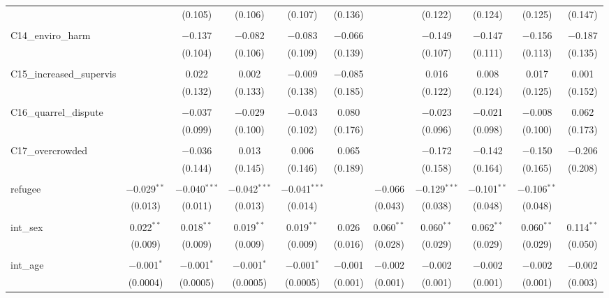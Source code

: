 \begin{table}[H]
\begin{tabular}{@{\extracolsep{4pt}}lcccccccccc}
  &  & (0.105) & (0.106) & (0.107) & (0.136) &  & (0.122) & (0.124) & (0.125) & (0.147) \\ 
  & & & & & & & & & & \\ 
 C14\_enviro\_harm &  & $-$0.137 & $-$0.082 & $-$0.083 & $-$0.066 &  & $-$0.149 & $-$0.147 & $-$0.156 & $-$0.187 \\ 
  &  & (0.104) & (0.106) & (0.109) & (0.139) &  & (0.107) & (0.111) & (0.113) & (0.135) \\ 
  & & & & & & & & & & \\ 
 C15\_increased\_supervis &  & 0.022 & 0.002 & $-$0.009 & $-$0.085 &  & 0.016 & 0.008 & 0.017 & 0.001 \\ 
  &  & (0.132) & (0.133) & (0.138) & (0.185) &  & (0.122) & (0.124) & (0.125) & (0.152) \\ 
  & & & & & & & & & & \\ 
 C16\_quarrel\_dispute &  & $-$0.037 & $-$0.029 & $-$0.043 & 0.080 &  & $-$0.023 & $-$0.021 & $-$0.008 & 0.062 \\ 
  &  & (0.099) & (0.100) & (0.102) & (0.176) &  & (0.096) & (0.098) & (0.100) & (0.173) \\ 
  & & & & & & & & & & \\ 
 C17\_overcrowded &  & $-$0.036 & 0.013 & 0.006 & 0.065 &  & $-$0.172 & $-$0.142 & $-$0.150 & $-$0.206 \\ 
  &  & (0.144) & (0.145) & (0.146) & (0.189) &  & (0.158) & (0.164) & (0.165) & (0.208) \\ 
  & & & & & & & & & & \\ 
 refugee & $-$0.029$^{**}$ & $-$0.040$^{***}$ & $-$0.042$^{***}$ & $-$0.041$^{***}$ &  & $-$0.066 & $-$0.129$^{***}$ & $-$0.101$^{**}$ & $-$0.106$^{**}$ &  \\ 
  & (0.013) & (0.011) & (0.013) & (0.014) &  & (0.043) & (0.038) & (0.048) & (0.048) &  \\ 
  & & & & & & & & & & \\ 
 int\_sex & 0.022$^{**}$ & 0.018$^{**}$ & 0.019$^{**}$ & 0.019$^{**}$ & 0.026 & 0.060$^{**}$ & 0.060$^{**}$ & 0.062$^{**}$ & 0.060$^{**}$ & 0.114$^{**}$ \\ 
  & (0.009) & (0.009) & (0.009) & (0.009) & (0.016) & (0.028) & (0.029) & (0.029) & (0.029) & (0.050) \\ 
  & & & & & & & & & & \\ 
 int\_age & $-$0.001$^{*}$ & $-$0.001$^{*}$ & $-$0.001$^{*}$ & $-$0.001$^{*}$ & $-$0.001 & $-$0.002 & $-$0.002 & $-$0.002 & $-$0.002 & $-$0.002 \\ 
  & (0.0004) & (0.0005) & (0.0005) & (0.0005) & (0.001) & (0.001) & (0.001) & (0.001) & (0.001) & (0.003) \\ 

\end{tabular}
\end{table}
